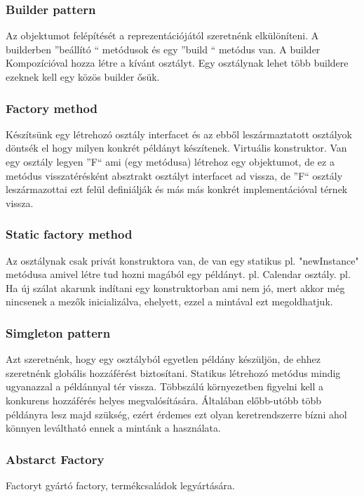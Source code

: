 \documentclass[a4paper,14pt]{extarticle}
\begin{document}
			\subsubsection{Builder pattern}
			Az objektumot felépítését a reprezentációjától szeretnénk elkülöníteni.
			A builderben ''beállító `` metódusok és egy ''build `` metódus van. A builder Kompozícióval hozza létre a kívánt osztályt.
			Egy osztálynak lehet több buildere ezeknek kell egy közös builder ősük.
			
			\subsubsection{Factory method}
			Készítsünk egy létrehozó osztály interfacet és az ebből leszármaztatott osztályok döntsék el hogy milyen konkrét példányt készítenek. Virtuális konstruktor.
			Van egy osztály legyen ''F`` ami (egy metódusa) létrehoz egy objektumot, de ez a metódus visszatérésként absztrakt osztályt interfacet ad vissza, de ''F`` osztály leszármazottai ezt felül definiálják és más más konkrét implementációval térnek vissza.
			
			\subsubsection{Static factory method}
			Az osztálynak csak privát konstruktora van, de van egy statikus pl. "newInstance" metódusa amivel létre tud hozni magából egy példányt. pl. Calendar osztály. pl. Ha új szálat akarunk indítani egy konstruktorban ami nem jó, mert akkor még nincsenek a mezők inicializálva, ehelyett, ezzel a mintával ezt megoldhatjuk.
			
			\subsubsection{Simgleton pattern}
			Azt szeretnénk, hogy egy osztályból egyetlen példány készüljön, de ehhez szeretnénk globális hozzáférést biztosítani.
			Statikus létrehozó metódus mindig ugyanazzal a példánnyal tér vissza.
			Többszálú környezetben figyelni kell a konkurens hozzáférés helyes megvalósítására.
			Általában előbb-utóbb több példányra lesz majd szükség, ezért érdemes ezt olyan keretrendszerre bízni ahol könnyen leváltható ennek a mintánk a használata.
			
			\subsubsection{Abstarct Factory}
			Factoryt gyártó factory, termékcsaládok legyártására.
			
\end{document}
